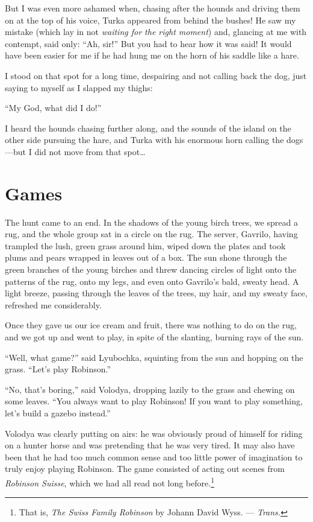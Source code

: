 But I was even more ashamed when, chasing after the hounds and driving them on at the top of his voice, Turka appeared from behind the bushes! He saw my mistake (which lay in not \emph{waiting for the right moment}) and, glancing at me with contempt, said only: ``Ah, sir!'' But you had to hear how it was said! It would have been easier for me if he had hung me on the horn of his saddle like a hare.

I stood on that spot for a long time, despairing and not calling back the dog, just saying to myself as I slapped my thighs:

``My God, what did I do!'' %

I heard the hounds chasing further along, and the sounds of the island on the other side pursuing the hare, and Turka with his enormous horn calling the dogs---but I did not move from that spot\ldots{}

\chapter{Games} %

The hunt came to an end. In the shadows of the young birch trees, we spread a rug, and the whole group sat in a circle on the rug. The server, Gavrilo, having trampled the lush, green grass around him, wiped down the plates and took plums and pears wrapped in leaves out of a box. The sun shone through the green branches of the young birches and threw dancing circles of light onto the patterns of the rug, onto my legs, and even onto Gavrilo's bald, sweaty head. A light breeze, passing through the leaves of the trees, my hair, and my sweaty face, refreshed me considerably.

Once they gave us our ice cream and fruit, there was nothing to do on the rug, and we got up and went to play, in spite of the slanting, burning rays of the sun.

``Well, what game?'' said Lyubochka, squinting from the sun and hopping on the grass. ``Let's play Robinson.'' %

``No, that's boring,'' said Volodya, dropping lazily to the grass and chewing on some leaves. ``You always want to play Robinson! If you want to play something, let's build a gazebo instead.'' %

Volodya was clearly putting on airs: he was obviously proud of himself for riding on a hunter horse and was pretending that he was very tired. It may also have been that he had too much common sense and too little power of imagination to truly enjoy playing Robinson. The game consisted of acting out scenes from \textit{Robinson Suisse}, which we had all read not long before.\footnote{That is, \textit{The Swiss Family Robinson} by Johann David Wyss. --- \textit{Trans.}}

